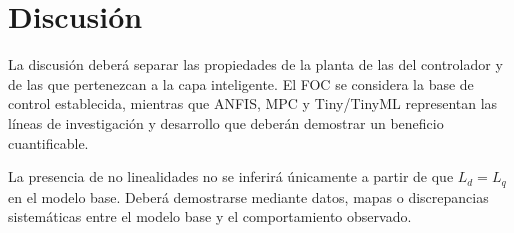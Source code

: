 \section{Discusión}

La discusión deberá separar las propiedades de la planta de las del controlador y de las que pertenezcan a la capa inteligente. El FOC se considera la base de control establecida, mientras que ANFIS, MPC y Tiny/TinyML representan las líneas de investigación y desarrollo que deberán demostrar un beneficio cuantificable.

La presencia de no linealidades no se inferirá únicamente a partir de que $L_d=L_q$ en el modelo base. Deberá demostrarse mediante datos, mapas o discrepancias sistemáticas entre el modelo base y el comportamiento observado.
